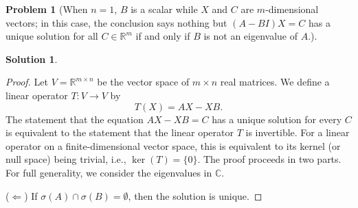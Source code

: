 \documentclass[12pt]{article}
\theoremstyle{definition}
\newtheorem*{solution}{\normalfont\textbf{Solution}}
\newtheorem*{Problem}{\noindent\textbf{Problem}}
\begin{document}
\begin{enumerate}[leftmargin=*]
\begin{Problem}
            [When \( n = 1 \), \( B \) is a scalar while \( X \) and \( C \) are \( m \)-dimensional vectors; in this case, the conclusion says nothing but \( (A - BI)X = C \) has a unique solution for all \( C \in \mathbb{R}^m \) if and only if \( B \) is not an eigenvalue of \( A \).]
        \end{Problem}
        \begin{solution}
            \begin{proof}
                Let \( V = \mathbb{R}^{m \times n} \) be the vector space of \( m \times n \) real matrices. We define a linear operator \( T: V \to V \) by
                \[
                T(X) = AX - XB.
                \]
                The statement that the equation \( AX - XB = C \) has a unique solution for every \( C \) is equivalent to the statement that the linear operator \( T \) is invertible. For a linear operator on a finite-dimensional vector space, this is equivalent to its kernel (or null space) being trivial, i.e., \( \ker(T) = \{0\} \). The proof proceeds in two parts. For full generality, we consider the eigenvalues in \( \mathbb{C} \).

                \noindent ($\Leftarrow$) If \( \sigma(A) \cap \sigma(B) = \emptyset \), then the solution is unique.


\end{proof}
\end{solution}
\end{enumerate}
\end{document}
